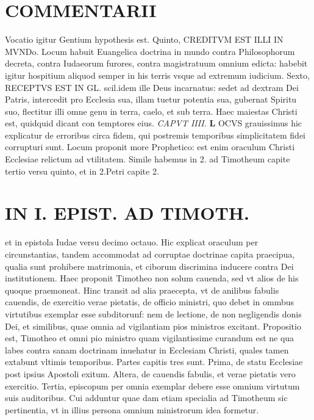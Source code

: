\documentclass{article}
\begin{document}
\begin{pages}
\section*{COMMENTARII }
\marginpar{[ p.82 ]}\pstart Vocatio igitur Gentium hypothesis est. Quinto, CREDITVM EST ILLI IN MVNDo. Locum habuit Euangelica doctrina in mundo contra Philosophorum decreta, contra Iudaeorum furores, contra magistratuum omnium edicta: habebit igitur hospitium aliquod semper in his terris vsque ad extremum iudicium.  \pend\pstart Sexto, RECEPTVS EST IN GL. scil.idem ille Deus incarnatus: sedet ad dextram Dei Patris, intercedit pro Ecclesia sua, illam tuetur potentia sua, gubernat Spiritu suo, flectitur illi omne genu in terra, caelo, et sub terra. Haec maiestas Christi est, quidquid dicant con temptores eius.  \pend
\textit{CAPVT IIII. }
\textbf{L }\pstart OCVS grauissimus hic explicatur de erroribus circa fidem, qui postremis temporibus simplicitatem fidei corrupturi sunt. Locum proponit more Prophetico: est enim oraculum Christi Ecclesiae relictum ad vtilitatem. Simile habemus in 2. ad Timotheum capite tertio versu quinto, et in 2.Petri capite 2.  \pend
\section*{IN I. EPIST. AD TIMOTH. }
\marginpar{[ p.83 ]}\pstart et in epistola Iudae versu decimo octauo. Hic explicat oraculum per circunstantias, tandem accommodat ad corruptae doctrinae capita praecipua, qualia sunt prohibere matrimonia, et ciborum discrimina inducere contra Dei institutionem.  \pend\pstart Haec proponit Timotheo non solum cauenda, sed vt alios de his quoque praemoneat. Hinc transit ad alia praecepta, vt de anilibus fabulis cauendis, de exercitio verae pietatis, de officio ministri, quo debet in ommbus virtutibus exemplar esse subditorunf: nem de lectione, de non negligendis donis Dei, et similibus, quae omnia ad vigilantiam pios ministros excitant.  \pend\pstart Propositio est, Timotheo et omni pio ministro quam vigilantissime curandum est ne qua labes contra sanam doctrinam inuehatur in Ecclesiam Christi, quales tamen extabunt vltimis temporibus.  \pend\pstart Partes capitis tres sunt. Prima, de statu Ecclesiae post ipsius Apostoli exitum. Altera, de cauendis fabulis, et verae pietatis vero exercitio. Tertia, episcopum per omnia exemplar debere esse omnium virtutum suis auditoribus. Cui adduntur quae dam etiam specialia ad Timotheum sic pertinentia, vt in illius persona omnium ministrorum idea formetur.  \pend

\end{pages}
\end{document}
